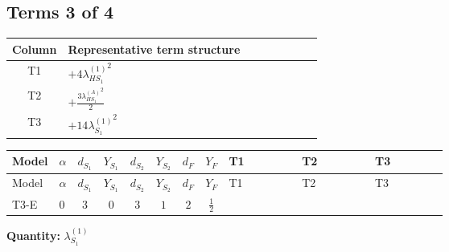 \documentclass[8pt]{article}
\begin{document}
\begin{landscape}
\subsection*{Terms 3 of 4}
\begin{center}
\begin{tabular}{@{}c >{\raggedright\arraybackslash}p{0.82\linewidth}@{}}
\toprule
Column & Representative term structure \\
\midrule
T1 & \(\displaystyle +4 {\lambda_{HS_1}^{(1)}}^2\) \\
\midrule
T2 & \(\displaystyle +\frac{3 {\lambda_{HS_1}^{(A)}}^2}{2}\) \\
\midrule
T3 & \(\displaystyle +14 {\lambda_{S_1}^{(1)}}^2\) \\
\midrule
\bottomrule
\end{tabular}
\end{center}
\smallskip
\tiny
\begin{longtable}{@{}llcccccc >{\raggedright\arraybackslash}p{0.21\linewidth} >{\raggedright\arraybackslash}p{0.21\linewidth} >{\raggedright\arraybackslash}p{0.21\linewidth}@{}}
\toprule
Model & $\alpha$ & $d_{S_1}$ & $Y_{S_1}$ & $d_{S_2}$ & $Y_{S_2}$ & $d_F$ & $Y_F$ & T1 & T2 & T3 \\
\midrule
\endfirsthead
\toprule
Model & $\alpha$ & $d_{S_1}$ & $Y_{S_1}$ & $d_{S_2}$ & $Y_{S_2}$ & $d_F$ & $Y_F$ & T1 & T2 & T3 \\
\midrule
\endhead
T3-E & $0$ & $3$ & $0$ & $3$ & $1$ & $2$ & $\frac{1}{2}$ & \scriptsize\adjustbox{max width=\linewidth}{$\begin{gathered} +4 {\lambda_{HS_1}^{(1)}}^2\end{gathered}$} & \scriptsize\adjustbox{max width=\linewidth}{$\begin{gathered} +\frac{3 {\lambda_{HS_1}^{(A)}}^2}{2}\end{gathered}$} & \scriptsize\adjustbox{max width=\linewidth}{$\begin{gathered} +14 {\lambda_{S_1}^{(1)}}^2\end{gathered}$} \\
\midrule
\bottomrule
\end{longtable}
\clearpage
\noindent\textbf{Quantity: }$\lambda_{S_1}^{(1)}$\par\smallskip

\end{landscape}
\end{document}
